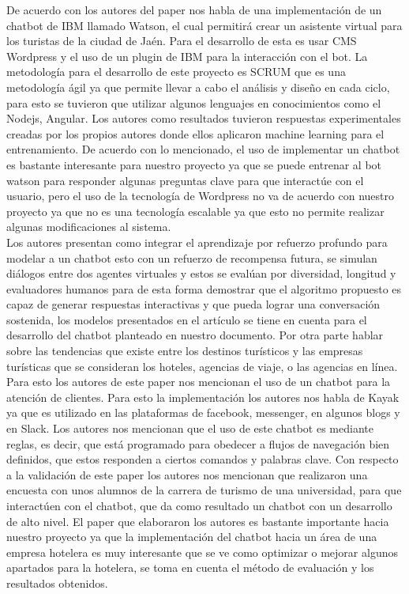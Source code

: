 \documentclass[12pt,a4paper,oneside]{article}
\begin{document}
    De acuerdo con los autores del paper nos habla de una implementación de un chatbot de IBM   llamado Watson, el cual permitirá crear un asistente virtual para los turistas de la ciudad de Jaén. Para el desarrollo de esta es usar CMS Wordpress y el uso de un plugin de IBM para la interacción con el bot. La metodología para el desarrollo de este proyecto es SCRUM que es una metodología ágil ya que permite llevar a cabo el análisis y diseño en cada ciclo, para esto se tuvieron que utilizar algunos lenguajes en conocimientos como el Nodejs, Angular.  Los autores como resultados tuvieron respuestas experimentales creadas por los propios autores donde ellos aplicaron machine learning para el entrenamiento. De acuerdo con lo mencionado, el uso de implementar un chatbot es bastante interesante para nuestro proyecto ya que se puede entrenar al bot watson para responder algunas preguntas clave para que interactúe con el usuario, pero el uso de la tecnología de Wordpress no va de acuerdo con nuestro proyecto ya que no es una tecnología escalable ya que esto no permite realizar algunas modificaciones al sistema.\cite{Muñoz2018}\\Los autores presentan como integrar el aprendizaje por refuerzo profundo para modelar a un chatbot esto con un refuerzo de recompensa futura, se simulan diálogos entre dos agentes virtuales y estos se evalúan por diversidad, longitud y evaluadores humanos para de esta forma demostrar que el algoritmo propuesto es capaz de generar respuestas interactivas y que pueda lograr una conversación sostenida, los modelos presentados en el artículo se tiene en cuenta para el desarrollo del chatbot planteado en nuestro documento. Por otra parte hablar sobre las tendencias que existe entre los destinos turísticos y las empresas turísticas que se consideran los hoteles, agencias de viaje, o las agencias en línea. Para esto los autores de este paper nos mencionan el uso de un chatbot para la atención de clientes. Para esto la implementación los autores nos habla de Kayak ya que es utilizado en las plataformas de facebook, messenger, en algunos blogs y en Slack. Los autores nos mencionan que el uso de este chatbot es mediante reglas, es decir, que está programado para obedecer a flujos de navegación bien definidos, que estos responden a ciertos comandos y palabras clave. Con respecto a la validación de este paper los autores nos mencionan que realizaron una encuesta con unos alumnos de la carrera de turismo de una universidad, para que interactúen con el chatbot, que da como resultado un chatbot con un desarrollo de alto nivel. El paper que elaboraron los autores es bastante importante hacia nuestro proyecto ya que la implementación del chatbot hacia un área de una empresa hotelera es muy interesante que se ve como optimizar o mejorar algunos apartados para la hotelera, se toma en cuenta el método de evaluación y los resultados obtenidos.\cite{Dias2020} \\
\end{document}
